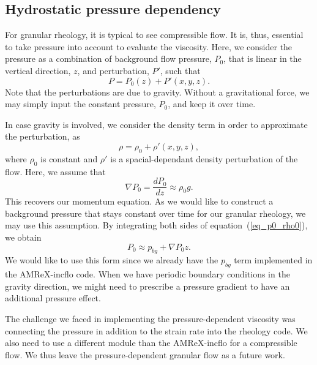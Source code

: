 
\subsection{Hydrostatic pressure dependency}
For granular rheology, it is typical to see compressible flow. It is, thus, essential to take pressure into account to evaluate the viscosity.
Here, we consider the pressure as a combination of background flow pressure, $P_0$, that is linear in the vertical direction, $z$, and perturbation, $P'$, such that
\[
P = P_0(z) + P'(x,y,z).\]
Note that the perturbations are due to gravity. Without a gravitational force, we may simply input the constant pressure, $P_0$, and keep it over time.
\par
In case gravity is involved, we consider the density term in order to approximate the perturbation, as 
\[
\rho  = \rho_0  + \rho'(x,y,z), 
\]
where $\rho_0$ is constant and $\rho'$ is a spacial-dependant density perturbation of the flow. 
Here, we assume that 
\begin{equation}
    \nabla P_0  = \frac{d P_0}{d z} \approx \rho_0  g.  
\label{eq_p0_rho0}
\end{equation}
This recovers our momentum equation. As we would like to construct a background pressure that stays constant over time for our granular rheology, we may use this assumption.
By integrating both sides of equation~(\ref{eq_p0_rho0}), we obtain
\begin{equation}
    P_0 \approx p_{bg} + \nabla P_0 z.
\end{equation}
We would like to use this form since we already have the $p_{bg}$ term implemented in the AMReX-incflo code.
%
When we have periodic boundary conditions in the gravity direction, we might need to prescribe a pressure gradient to have an additional pressure effect. 
\par
The challenge we faced in implementing the pressure-dependent viscosity was connecting the pressure in addition to the strain rate into the rheology code. 
We also need to use a different module than the AMReX-incflo for a compressible flow.
 We thus leave the pressure-dependent granular flow as a future work.
